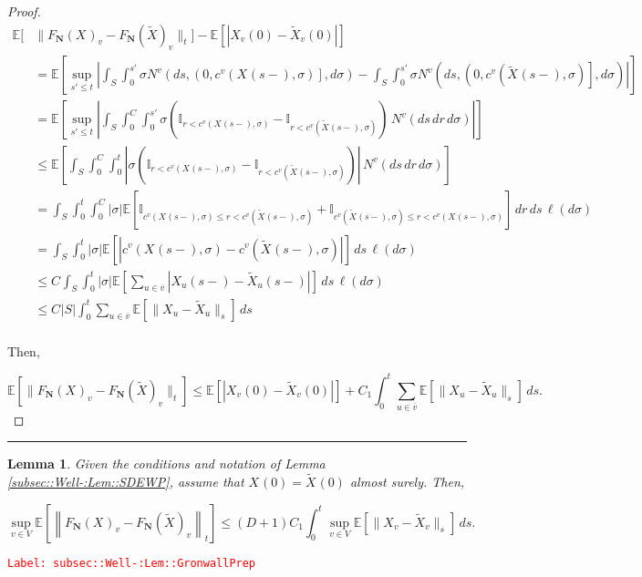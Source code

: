 \documentclass[12pt]{article}
\newcommand{\mb}{\mathbb}
\newcommand{\ov}{\overline}
\newcommand{\tr}{\textcolor{red}}
\newcommand{\labe}[1]{\tr{\texttt{Label: #1}}}
\newcommand{\lin}{\rule{\linewidth}{0.4 pt}}
\newcommand{\ex}[1]{\mb{E}\left[#1\right]}			%
\renewcommand{\v}{v}							%
\newcommand{\vv}{u}								%
\renewcommand{\S}{S}							%
\newcommand{\s}{\sigma}							%
\renewcommand{\t}{t}							%
\renewcommand{\tt}{s}							%
\newcommand{\ttt}{s'}							%
\newcommand{\X}{X}								%
\newcommand{\IGr}{c}							%
\newcommand{\vind}[1]{^{#1}}					%
\newcommand{\cind}[1]{_{#1}}					%
\newcommand{\cl}{\ov}							%
\newcommand{\tp}[1]{(#1)}						%
\newcommand{\tip}[1]{#1}						%
\newcommand{\const}{C}							%
\newcommand{\degr}{D}							%
\newcommand{\poisses}{\mathbf{N}}				%
\newcommand{\poiss}{N}							%
\newcommand{\Sm}{\ell}							%
\newcommand{\Fpo}{F_{\poisses}}					%
\renewcommand{\r}{r}							%
\newcommand{\alt}[1]{\widetilde{#1}}			%
\newcommand{\indx}[1]{_{#1}}					%
\newtheorem{lem}[thms]{Lemma}
\begin{document}
\begin{proof}
\begin{align*}
\mb{E}\bigg[&\|\Fpo(\X\cind{}\tip{})\cind{\v} - \Fpo(\alt{\X})\cind{\v}\|_\t\bigg] - \ex{|\X\cind{\v}\tp{0} - \alt{\X}\cind{\v}\tp{0}|}\\
&= \ex{\sup_{\ttt \leq \t}\left|\int_\S\int_0^{\ttt} \s\poiss\vind{\v}\left(d\tt,\left(0,\IGr\vind{\v}(\X\cind{}\tp{\tt-},\s)\right],d\s\right) -  \int_\S\int_0^{\ttt} \s\poiss\vind{\v}\left(d\tt,\left(0,\IGr\vind{\v}(\alt{\X}\cind{}\tp{\tt-},\s)\right],d\s\right)\right|}\\
&=\ex{\sup_{\ttt\leq \t} \left|\int_\S \int_0^{\const\indx{}} \int_0^{\ttt} \s\left(\mb{I}_{\r < \IGr\vind{\v}(\X\cind{}\tp{\tt-},\s)} - \mb{I}_{\r < \IGr\vind{\v}(\alt{\X}\cind{}\tp{\tt-},\s)}\right)\,\poiss\vind{\v}(d\tt\,d\r\,d\s)\right|}\\
&\leq \ex{\int_\S\int_0^{\const\indx{}}\int_0^\t \left|\s\left(\mb{I}_{\r < \IGr\vind{\v}(\X\cind{}\tp{\tt-},\s)} - \mb{I}_{\r < \IGr\vind{\v}(\alt{\X}\cind{}\tp{\tt-},\s)}\right)\right|\,\poiss\vind{\v}(d\tt\,d\r\,d\s)}\\
&=\int_\S\int_0^\t\int_0^{\const\indx{}} |\s|\ex{\mb{I}_{\IGr\vind{\v}(\X\cind{}\tp{\tt-},\s) \leq \r < \IGr\vind{\v}(\alt{\X}\cind{}\tp{\tt-},\s)} + \mb{I}_{\IGr\vind{\v}(\alt{\X}\cind{}\tp{\tt-},\s) \leq \r < \IGr\vind{\v}(\X\cind{}\tp{\tt-},\s)}}\,d\r\,d\tt\,\Sm(d\s)\\
&= \int_\S\int_0^\t|\s|\ex{\left|\IGr\vind{\v}(\X\cind{}\tp{\tt-},\s) - \IGr\vind{\v}(\alt{\X}\cind{}\tp{\tt-},\s)\right|}\,d\tt\,\Sm(d\s)\\
&\leq \const\indx{}\int_\S\int_0^\t |\s| \ex{\sum_{\vv \in \cl{\v}}|\X\cind{\vv}\tp{\tt-} - \alt{\X}\cind{\vv}\tp{\tt-}|}\,d\tt\,\Sm(d\s)\\
&\leq \const\indx{}|\S|\int_0^\t \sum_{\vv \in \cl{\v}}\ex{\|\X\cind{\vv}\tip{} - \alt{\X}\cind{\vv}\tip{}\|_\tt}\,d\tt\\
\end{align*}

Then,

\[\ex{\|\Fpo(\X\cind{}\tip{})\cind{\v} - \Fpo(\alt{\X})\cind{\v}\|_\t} \leq \ex{|\X\cind{\v}\tp{0} - \alt{\X}\cind{\v}\tp{0}|} +  \const\indx{1}\int_0^\t \sum_{\vv\in \cl{\v}} \ex{\|\X\cind{\vv}\tip{} - \alt{\X}\cind{\vv}\tip{}\|_\tt}\,d\tt.\]

\end{proof}

\lin

\begin{lem}
Given the conditions and notation of Lemma \ref{subsec::Well-:Lem::SDEWP}, assume that \(\X\cind{}\tp{0} = \alt{\X}\cind{}\tp{0}\) almost surely. Then,

\[\sup_{\v \in V} \ex{\left\|\Fpo(\X\cind{}\tip{})\cind{\v} - \Fpo(\alt{\X}\cind{}\tip{})\cind{\v}\right\|_\t} \leq (\degr+1)\const\indx{1}\int_0^\t \sup_{\v \in V} \ex{\|\X\cind{\v}\tip{} - \alt{\X}\cind{\v}\tip{}\|_\tt}\,d\tt.\]
\label{subsec::Well-:Lem::GronwallPrep}
\end{lem}
\labe{subsec::Well-:Lem::GronwallPrep}
\end{document}
